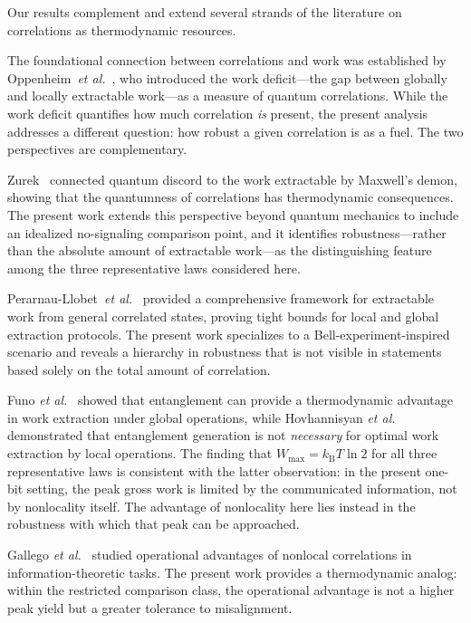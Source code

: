 \documentclass[pra,twocolumn,showpacs,preprintnumbers,amsmath,amssymb,longbibliography,
               superscriptaddress]{revtex4-2}
\begin{document}
{Our results complement and extend several strands of the literature on
correlations as thermodynamic resources.}

{The foundational connection between correlations and work was
established by Oppenheim~\emph{et al.}~\cite{Oppenheim2002}, who
introduced the work deficit---the gap between globally and locally
extractable work---as a measure of quantum correlations.
While the work deficit quantifies how much correlation \emph{is}
present, the present analysis addresses a different question: how
robust a given correlation is as a fuel.
The two perspectives are complementary.}

{Zurek~\cite{Zurek2003} connected quantum discord to the work
extractable by Maxwell's demon, showing that the quantumness of
correlations has thermodynamic consequences.
The present work extends this perspective beyond quantum mechanics to
include an idealized no-signaling comparison point, and it identifies
robustness---rather than the absolute amount of extractable work---as
the distinguishing feature among the three representative laws
considered here.}

{Perarnau-Llobet~\emph{et al.}~\cite{PerarnauLlobet2015} provided a
comprehensive framework for extractable work from general correlated
states, proving tight bounds for local and global extraction protocols.
The present work specializes to a Bell-experiment-inspired scenario and
reveals a hierarchy in robustness that is not visible in statements
based solely on the total amount of correlation.}

{Funo \emph{et al.}~\cite{funo2013} showed that entanglement can
provide a thermodynamic advantage in work extraction under global
operations, while Hovhannisyan \emph{et al.}~\cite{hovhannisyan2013}
demonstrated that entanglement generation is not \emph{necessary} for
optimal work extraction by local operations.
The finding that $W_{\max} = k_{\mathrm{B}}T\ln 2$ for all three
representative laws is consistent with the latter observation:
in the present one-bit setting, the peak gross work is limited by the
communicated information, not by nonlocality itself.
The advantage of nonlocality here lies instead in the robustness with
which that peak can be approached.}

{Gallego \emph{et al.}~\cite{gallego2010} studied operational
advantages of nonlocal correlations in information-theoretic tasks.
The present work provides a thermodynamic analog: within the restricted
comparison class, the operational advantage is not a higher peak yield
but a greater tolerance to misalignment.}
\end{document}
